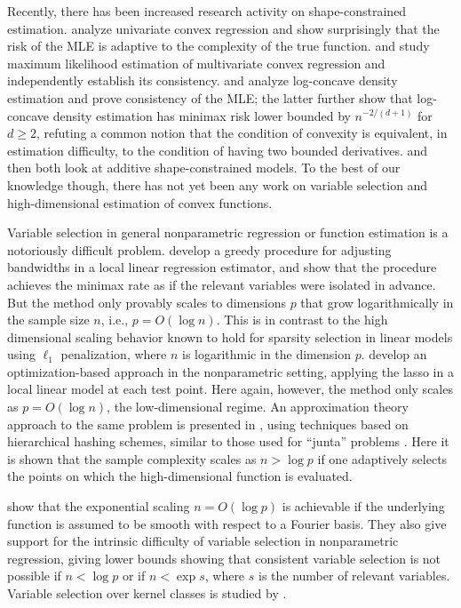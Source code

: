Recently, there has been increased research activity on shape-constrained estimation. \cite{guntusen:13} analyze univariate convex regression and show surprisingly that the risk of the MLE is adaptive to the complexity of the true function. \cite{seijo2011nonparametric} and \cite{Lim:12} study maximum likelihood estimation of multivariate convex regression and independently establish its consistency. \cite{Cule:10} and \cite{kim2014global} analyze log-concave density estimation and prove consistency of the MLE; the latter further show that log-concave density estimation has minimax risk lower bounded by $n^{-2/(d+1)}$ for $d \geq 2$, refuting a common notion that the condition of convexity is equivalent, in estimation difficulty, to the condition of having two bounded derivatives. \cite{pya2014shape} and then \cite{chen2014generalised} both look at additive shape-constrained models. To the best of our knowledge though, there has not yet been any work on variable selection and high-dimensional estimation of convex functions.

Variable selection in general nonparametric regression or function
estimation is a notoriously difficult problem. \citet{lafferty2008rodeo} develop a greedy procedure for
adjusting bandwidths in a local linear regression estimator,
and show that the procedure achieves the minimax rate
as if the relevant variables were isolated in advance.
But the method only provably scales to dimensions $p$ that 
grow logarithmically in the sample size $n$, i.e., $p = O(\log n)$.  This
is in contrast to the high dimensional scaling behavior
known to hold for sparsity selection in linear models
using $\ell_1$ penalization, where $n$
is logarithmic in the dimension $p$. \citet{bertin:08}
develop an optimization-based approach in
the nonparametric setting, applying the lasso
in a local linear model at each test point.  Here again,
however, the method only scales as $p = O(\log n)$,
the low-dimensional regime.
An approximation theory approach to the same
problem is presented in \cite{devore:11}, 
using techniques based on hierarchical hashing schemes,
similar to those used for ``junta'' problems \citep{mossel:04}.
Here it is shown that the sample complexity scales as $n > \log p$ 
if one adaptively selects the points on
which the high-dimensional function is evaluated.

\citet{dalalyan:12} show that the exponential scaling $n=O(\log p)$ is
achievable if the underlying function is assumed to be smooth with
respect to a Fourier basis. They also give support for the intrinsic
difficulty of variable selection in nonparametric regression, giving
lower bounds showing that consistent variable selection is not
possible if $n < \log p$ or if $n < \exp s$, where $s$ is the number
of relevant variables.  Variable selection over kernel classes is
studied by \citet{Kolch:10}.

